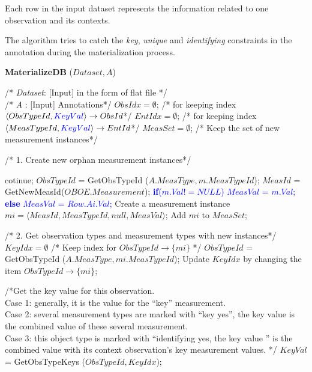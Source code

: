 \documentclass[10pt]{article}
\begin{document}
Each row in the input dataset represents the information related to one observation and its contexts.

The algorithm tries to catch the {\em key}, {\em unique} and {\em identifying} constraints in the annotation during the materialization process.

\begin{algorithm} [htb]
\caption{{\bf MaterializeDB} ($Dataset, A$)}
{\small
\begin{algorithmic}
\STATE /* {\em Dataset}: [Input] in the form of flat file */\\
\STATE /* {\em A }:  [Input] Annotations*/
\STATE
\STATE $ObsIdx =\emptyset$;  /* for keeping index $\langle ObsTypeId, \textcolor{blue}{KeyVal}\rangle \rightarrow ObsId$*/
\STATE $EntIdx = \emptyset$;  /* for keeping index $\langle MeasTypeId, \textcolor{blue}{KeyVal}\rangle \rightarrow EntId$*/
    \STATE $MeasSet = \emptyset$; /* Keep the set of new measurement instances*/

    \STATE
    \STATE/* 1. Create new orphan measurement instances*/
		
		\STATE cotinue;
		\ENDIF
		\STATE $ObsTypeId$ = GetObsTypeId ($A.MeasType, m.MeasTypeId$);
		\STATE
		\STATE $MeasId$ = GetNewMeasId($OBOE.Measurement$);
		\STATE \textcolor{blue}{{\bf if}($m.Val!=NULL$) $MeasVal$ = $m.Val$; }
		\STATE \textcolor{blue}{{\bf else} $MeasVal$ = $Row.Ai.Val$;}
		\STATE Create a measurement instance $mi = \langle MeasId, MeasTypeId, null, MeasVal\rangle$;
		\STATE Add $mi$ to $MeasSet$;
	\ENDFOR

    \STATE
    \STATE /* 2. Get observation types and measurement types with new instances*/
    \STATE $KeyIdx=\emptyset$ /* Keep index for $ObsTypeId \rightarrow \{mi\}$ */
    \STATE $ObsTypeId$ = GetObsTypeId ($A.MeasType, mi.MeasTypeId$);
	\STATE Update $KeyIdx$ by changing the item $ObsTypeId \rightarrow \{mi\}$;
    \ENDFOR

    \STATE
        \STATE /*Get the key value for this observation. \\
                   Case 1: generally, it is the value for the ``key'' measurement. \\
                   Case 2: several measurement types are marked with ``key yes'', the key value is the combined value of these several measurement. \\
                   Case 3: this object type is marked with ``identifying yes, the key value '' is the combined value with its context observation's key measurement values. */
        \STATE $KeyVal$ = GetObsTypeKeys ($ObsTypeId, KeyIdx$);


\end{algorithmic}}
\end{algorithm}
\end{document}
